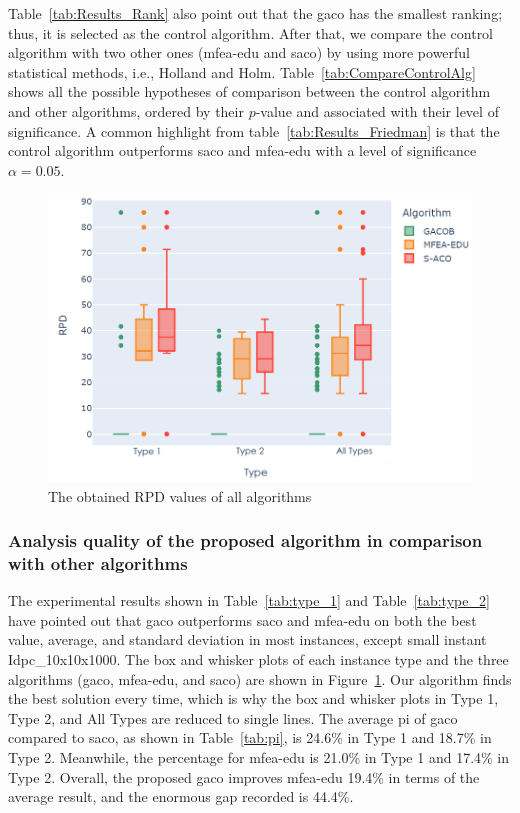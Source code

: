 Table~\ref{tab:Results_Rank} also point out that the \acrshort{gaco} has the smallest ranking; thus, it is selected as the control algorithm. After that, we compare the control algorithm with two other ones (\acrshort{mfea-edu} and \acrshort{saco}) by using more powerful statistical methods, i.e., Holland and Holm. Table~\ref{tab:CompareControlAlg} shows all the possible hypotheses of comparison between the control algorithm and other algorithms, ordered by their $p$-value and associated with their level of significance. A common highlight from table~\ref{tab:Results_Friedman} is that the control algorithm outperforms \acrshort{saco} and \acrshort{mfea-edu} with a level of significance $\alpha = 0.05$.

\renewcommand{\scalefigure}{0.5}
\begin{figure}[htbp]
	\centering
	\includegraphics[scale=\scalefigure]{Figures/chap 4/RPD_each_set.png}
	\caption{The obtained RPD values of all algorithms}
	\label{fig:rpd}
\end{figure}

\subsubsection{Analysis quality of the proposed algorithm in comparison with other algorithms}
The experimental results shown in Table~\ref{tab:type_1} and Table~\ref{tab:type_2} have pointed out that \acrshort{gaco} outperforms \acrshort{saco} and \acrshort{mfea-edu} on both the best value, average, and standard deviation in most instances, except small instant Idpc\_10x10x1000. The box and whisker plots of each instance type and the three algorithms (\acrshort{gaco}, \acrshort{mfea-edu}, and \acrshort{saco}) are shown in Figure~\ref{fig:rpd}. Our algorithm finds the best solution every time, which is why the box and whisker plots in Type 1, Type 2, and All Types are reduced to single lines. The average \gls{pi} of \acrshort{gaco} compared to \acrshort{saco}, as shown in Table~\ref{tab:pi}, is 24.6\% in Type 1 and  18.7\% in Type 2. Meanwhile, the percentage for \acrshort{mfea-edu} is 21.0\% in Type 1 and 17.4\% in Type 2. Overall, the proposed \acrshort{gaco} improves \acrshort{mfea-edu}  19.4\% in terms of the average result, and the enormous gap recorded is 44.4\%.

